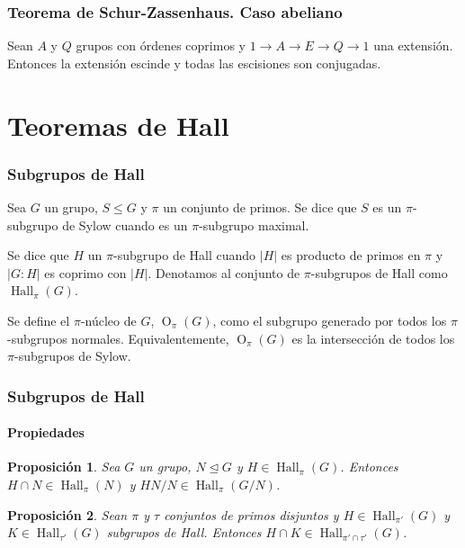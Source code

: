 \documentclass[
	11pt, %
]{beamer}
\DeclareMathOperator{\SylowSubgroup}{Syl}
\DeclareMathOperator{\HallSubgroup}{Hall}
\DeclareMathOperator{\OSubgroup}{O}
\newcommand{\Syl}[2]{\SylowSubgroup_{#1}(#2)}
\newcommand{\Hall}[2]{\HallSubgroup_{#1}(#2)}
\newcommand{\Core}[2]{\OSubgroup_{#1}(#2)}
\newcommand{\norm}{\trianglelefteq}
\newcommand{\ord}[1]{\left|#1\right|}%
\newcommand{\extension}[5]{1\xrightarrow{} #3 \xrightarrow{#1} #4\xrightarrow{#2} #5 \xrightarrow{} 1}
\newtheorem{proposition}{Proposici\'on}
\begin{document}
\begin{frame}
	\frametitle{Teorema de Schur-Zassenhaus. Caso abeliano}
	\begin{theorem}
		Sean $A$ y $Q$ grupos con órdenes coprimos y $\extension {}{} A E Q$ una extensión. Entonces la extensión escinde y todas las escisiones son conjugadas.
	\end{theorem}
\end{frame}



\section{Teoremas de Hall}

\begin{frame}
	\frametitle{Subgrupos de Hall}
	
	\begin{definition}
		Sea $G$ un grupo, $S\leq G$ y $\pi$ un conjunto de primos. Se dice que $S$ es un $\pi$-subgrupo de Sylow cuando es un $\pi$-subgrupo maximal. %
	\end{definition}
	\pause
	\begin{definition}
		Se dice que $H$ un $\pi$-subgrupo de Hall cuando $\ord{H}$ es producto de primos en $\pi$ y $\ord{G:H}$ es coprimo con $\ord H$. Denotamos al conjunto de $\pi$-subgrupos de Hall como $\Hall \pi G$.
	\end{definition}
	\pause
	\smallskip %
	
	\begin{definition}
		Se define el $\pi$-núcleo de $G$, $\Core \pi G$, como el subgrupo generado por todos los $\pi$-subgrupos normales. Equivalentemente, $\Core \pi G$ es la intersección de todos los $\pi$-subgrupos de Sylow.
	\end{definition}  
	
\end{frame}

\begin{frame}
	\frametitle{Subgrupos de Hall}
	\framesubtitle{Propiedades}

	\begin{proposition}
		Sea $G$ un grupo, $N\norm G$ y $H\in \Hall \pi G$. Entonces $H\cap N \in \Hall \pi {N}$ y $HN/N\in \Hall \pi{ G/N}$.
	\end{proposition}
	
	\begin{proposition}
		Sean $\pi$ y $\tau$ conjuntos de primos disjuntos y $H\in \Hall {\pi'} G$ y $K\in \Hall {\tau'} G$ subgrupos de Hall. Entonces $H\cap K\in \Hall {\pi'\cap\tau'} G$.
	\end{proposition}
\end{frame}
\end{document}
